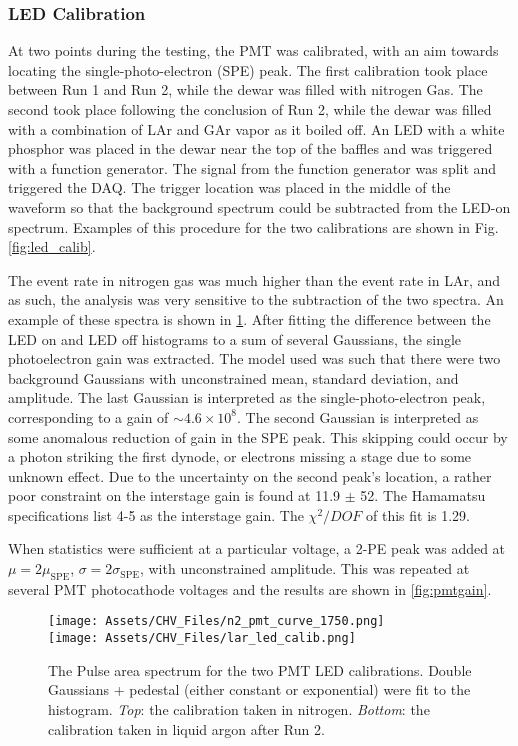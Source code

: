 \subsubsection{LED Calibration}
At two points during the testing, the PMT was calibrated, with an aim towards locating the single-photo-electron (SPE) peak.
The first calibration took place between Run 1 and Run 2, while the dewar was filled with nitrogen Gas.
The second took place following the conclusion of Run 2, while the dewar was filled with a combination of LAr and GAr vapor as it boiled off.
An LED with a white phosphor was placed in the dewar near the top of the baffles and was triggered with a function generator.
The signal from the function generator was split and triggered the DAQ.
The trigger location was placed in the middle of the waveform so that the background spectrum could be subtracted from the LED-on spectrum. 
Examples of this procedure for the two calibrations are shown in Fig. \ref{fig:led_calib}.

The event rate in nitrogen gas was much higher than the event rate in LAr, and as such, the analysis was very sensitive to the subtraction of the two spectra.
An example of these spectra is shown in \ref{fig:pmtnitrogen}.
After fitting the difference between the LED on and LED off histograms to a sum of several Gaussians, the single photoelectron gain was extracted.
The model used was such that there were two background Gaussians with unconstrained mean, standard deviation, and amplitude. 
The last Gaussian is interpreted as the single-photo-electron peak, corresponding to a gain of $\sim 4.6 \times 10^8$.
The second Gaussian is interpreted as some anomalous reduction of gain in the SPE peak.
This skipping could occur by a photon striking the first dynode, or electrons missing a stage due to some unknown effect.
Due to the uncertainty on the second peak's location, a rather poor constraint on the interstage gain is found at 11.9 $\pm$ 52.
The Hamamatsu specifications list 4-5 as the interstage gain. 
The $\chi^2/DOF$ of this fit is 1.29.

When statistics were sufficient at a particular voltage, a 2-PE peak was added at $\mu = 2 \mu_\mathrm{SPE}$, $\sigma = 2 \sigma_\mathrm{SPE}$, with unconstrained amplitude.
This was repeated at several PMT photocathode voltages and the results are shown in \ref{fig:pmtgain}.

\begin{figure}
\centering
\texttt{[image: Assets/CHV\_Files/n2\_pmt\_curve\_1750.png]}\\
\texttt{[image: Assets/CHV\_Files/lar\_led\_calib.png]}
\label{fig:pmtnitrogen}
\caption[The Pulse area spectrum for the two PMT LED calibrations. ]%
{The Pulse area spectrum for the two PMT LED calibrations. 
Double Gaussians + pedestal (either constant or exponential) were fit to the histogram.
\textit{Top}: the calibration taken in nitrogen.
\textit{Bottom}: the calibration taken in liquid argon after Run 2.
}
\end{figure}

